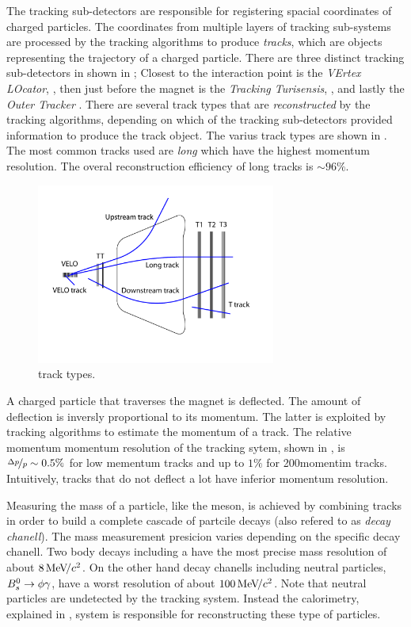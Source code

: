 The tracking sub-detectors are responsible for registering spacial coordinates of charged particles.
The coordinates from multiple layers of tracking sub-systems are processed by the tracking algorithms
to produce {\it tracks}, which are objects representing the trajectory of a charged particle. There are
three distinct tracking sub-detectors in \lhcb shown in ; Closest to the interaction point is
the {\it VErtex LOcator}, \velo, then just before the \lhcb magnet is the {\it Tracking Turisensis}, \ttracker,
and  lastly the {\it Outer Tracker} \ot. There are several track types that are {\it reconstructed} by
the tracking algorithms, depending on which of the tracking sub-detectors provided information to produce
the track object. The varius track types are shown in \figref{}. The most common tracks used are {\it long}
which have the highest momentum resolution. The overal reconstruction efficiency of long tracks is $\sim 96\%$.

\begin{figure}[t]
  \centering
  \includegraphics[width=0.7\textwidth]{Figures/Chapter2/trackTypesRunIAndII}
  \caption{\lhcb track types.}
  \label{track_types}
\end{figure}

A charged particle that traverses the \lhcb magnet is deflected. The amount of deflection is inversly proportional
to its momentum. The latter is exploited by tracking algorithms to estimate the momentum of a track. The relative
momentum momentum resolution of the tracking sytem, shown in , is $\nicefrac{\Delta p}{p} \sim 0.5 \%$
for low mementum tracks and up to $1\%$ for 200\gevc momentim tracks. Intuitively, tracks that do not deflect a
lot have inferior momentum resolution.

Measuring the mass of a particle, like the \Bs meson, is achieved by combining tracks in order to build a complete
cascade of partcile decays (also refered to as {\it decay chanell}). The mass measurement presicion varies depending
on the specific decay chanell. Two body \B decays including a \jpsi have the most precise mass resolution of about
$8 {\mathrm{\,Me\kern -0.1em V\!/}c^2}$. On the other hand decay chanells including neutral particles, \ie $B^0_s\rightarrow\phi\gamma$, have a worst resolution of
about $100 {\mathrm{\,Me\kern -0.1em V\!/}c^2}$. Note that neutral particles are undetected by the tracking system. Instead the calorimetry,
explained in \secref{}, system is responsible for reconstructing these type of particles.

